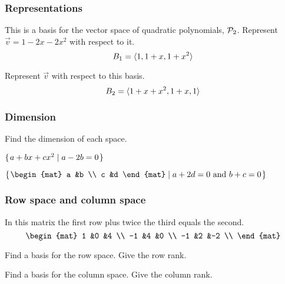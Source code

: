 \documentclass{checkin}
\begin{document}
\begin{frame}\frametitle{Representations}
\begin{questions}
\item This is a basis for the vector space of quadratic
polynomials, $\mathcal{P}_2$. 
Represent $\vec{v}=1-2x-2x^2$
with respect to it. 
\begin{equation*}
  B_1=\langle1,1+x,1+x^2\rangle
\end{equation*}

\item Represent $\vec{v}$ with respect to this basis.
\begin{equation*}
  B_2=\langle1+x+x^2,1+x,1\rangle
\end{equation*}
\end{questions}
\end{frame}



\begin{frame}\frametitle{Dimension}
Find the dimension of each space.
\begin{questions}
\item $\mbox{$\{\hspace{0.1em}a+bx+cx^2\mid a-2b=0\hspace{0.1em}\}$}$
\item
  $\set{\begin{mat}
          a  &b  \\
          c  &d
        \end{mat} \suchthat \text{$a+2d=0$ and $b+c=0$}}$ 
\end{questions}
\end{frame}




\begin{frame}\frametitle{Row space and column space}
In this matrix the first row plus twice the third equals the second.
\begin{equation*}
  \begin{mat}
    1  &0  &4  \\
   -1  &4  &0  \\
   -1  &2  &-2  \\
  \end{mat}
\end{equation*}
\begin{questions}
\item Find a basis for the row space.
Give the row rank. 
\item Find a basis for the column space.
Give the column rank. 
\end{questions}
\end{frame}
\end{document}
